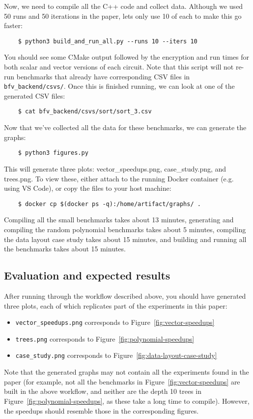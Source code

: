 Now, we need to compile all the C++ code and collect data. Although we used 50 runs and 50 iterations in the paper, lets only use 10 of each to make this go faster:
\begin{verbatim}
    $ python3 build_and_run_all.py --runs 10 --iters 10    
\end{verbatim}
You should see some CMake output followed by the encryption and run times for both scalar and vector versions of each circuit. Note that this script will not re-run benchmarks that already have corresponding CSV files in {\tt bfv\_backend/csvs/}.
Once this is finished running, we can look at one of the generated CSV files:
\begin{verbatim}
    $ cat bfv_backend/csvs/sort/sort_3.csv    
\end{verbatim}
Now that we've collected all the data for these benchmarks, we can generate the graphs:
\begin{verbatim}
    $ python3 figures.py
\end{verbatim}
This will generate three plots: vector\_speedups.png, case\_study.png, and trees.png. To view these, either attach to the running Docker container (e.g. using VS Code), or copy the files to your host machine:
\begin{verbatim}
    $ docker cp $(docker ps -q):/home/artifact/graphs/ .    
\end{verbatim}

Compiling all the small benchmarks takes about 13 minutes, generating and compiling the random polynomial benchmarks takes about 5 minutes, compiling the data layout case study takes about 15 minutes, and building and running all the benchmarks takes about 15 minutes.


\subsection{Evaluation and expected results}

After running through the workflow described above, you should have generated three plots, each of which replicates part of the experiments in this paper:
\begin{itemize}
    \item {\tt vector\_speedups.png} corresponds to Figure~\ref{fig:vector-speedups}
    \item {\tt trees.png} corresponds to Figure~\ref{fig:polynomial-speedups}
    \item {\tt case\_study.png} corresponds to Figure~\ref{fig:data-layout-case-study}
\end{itemize}
Note that the generated graphs may not contain all the experiments found in the paper (for example, not all the benchmarks in Figure~\ref{fig:vector-speedups} are built in the above workflow, and neither are the depth 10 trees in Figure~\ref{fig:polynomial-speedups}, as these take a long time to compile).
However, the speedups should resemble those in the corresponding figures.

